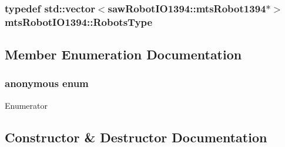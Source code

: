 \subsubsection[{Robots\+Type}]{\setlength{\rightskip}{0pt plus 5cm}typedef std\+::vector$<$saw\+Robot\+I\+O1394\+::mts\+Robot1394$\ast$$>$ {\bf mts\+Robot\+I\+O1394\+::\+Robots\+Type}\hspace{0.3cm}{\ttfamily [protected]}}\label{classmts_robot_i_o1394_ab8da6d2d438f82df01169c5bd528c9b3}


\subsection{Member Enumeration Documentation}
\hypertarget{classmts_robot_i_o1394_a6c6b76c5f7e32dfea5db3ef87a4b2c3e}{}\subsubsection[{anonymous enum}]{\setlength{\rightskip}{0pt plus 5cm}anonymous enum}\label{classmts_robot_i_o1394_a6c6b76c5f7e32dfea5db3ef87a4b2c3e}
\begin{Desc}
\item[Enumerator]\par
\begin{description}
\item[{\em 
\hypertarget{classmts_robot_i_o1394_a6c6b76c5f7e32dfea5db3ef87a4b2c3eae14ba9547603419cc36292983705a60d}{}M\+A\+X\+\_\+\+B\+O\+A\+R\+D\+S\label{classmts_robot_i_o1394_a6c6b76c5f7e32dfea5db3ef87a4b2c3eae14ba9547603419cc36292983705a60d}
}]\end{description}
\end{Desc}


\subsection{Constructor \& Destructor Documentation}
\hypertarget{classmts_robot_i_o1394_aee827574818e204a24ae21a0604a2547}{}
